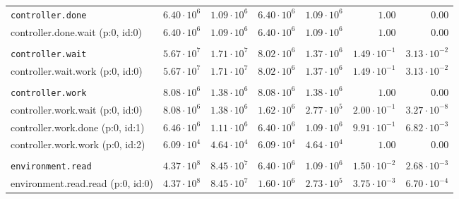 \begin{table}[htbp]
{\begin{tabular}{lrrrrrr}
\\[-8pt]\texttt{controller.done}              & $6.40 \cdot 10^{6}$ & $1.09 \cdot 10^{6}$ & $6.40 \cdot 10^{6}$ & $1.09 \cdot 10^{6}$ &               $1.00$ &               $0.00$ \\
\hspace{3mm}controller.done.wait (p:0, id:0)  & $6.40 \cdot 10^{6}$ & $1.09 \cdot 10^{6}$ & $6.40 \cdot 10^{6}$ & $1.09 \cdot 10^{6}$ &               $1.00$ &               $0.00$ \\
\\[-8pt]\texttt{controller.wait}              & $5.67 \cdot 10^{7}$ & $1.71 \cdot 10^{7}$ & $8.02 \cdot 10^{6}$ & $1.37 \cdot 10^{6}$ & $1.49 \cdot 10^{-1}$ & $3.13 \cdot 10^{-2}$ \\
\hspace{3mm}controller.wait.work (p:0, id:0)  & $5.67 \cdot 10^{7}$ & $1.71 \cdot 10^{7}$ & $8.02 \cdot 10^{6}$ & $1.37 \cdot 10^{6}$ & $1.49 \cdot 10^{-1}$ & $3.13 \cdot 10^{-2}$ \\
\\[-8pt]\texttt{controller.work}              & $8.08 \cdot 10^{6}$ & $1.38 \cdot 10^{6}$ & $8.08 \cdot 10^{6}$ & $1.38 \cdot 10^{6}$ &               $1.00$ &               $0.00$ \\
\hspace{3mm}controller.work.wait (p:0, id:0)  & $8.08 \cdot 10^{6}$ & $1.38 \cdot 10^{6}$ & $1.62 \cdot 10^{6}$ & $2.77 \cdot 10^{5}$ & $2.00 \cdot 10^{-1}$ & $3.27 \cdot 10^{-8}$ \\
\hspace{3mm}controller.work.done (p:0, id:1)  & $6.46 \cdot 10^{6}$ & $1.11 \cdot 10^{6}$ & $6.40 \cdot 10^{6}$ & $1.09 \cdot 10^{6}$ & $9.91 \cdot 10^{-1}$ & $6.82 \cdot 10^{-3}$ \\
\hspace{3mm}controller.work.work (p:0, id:2)  & $6.09 \cdot 10^{4}$ & $4.64 \cdot 10^{4}$ & $6.09 \cdot 10^{4}$ & $4.64 \cdot 10^{4}$ &               $1.00$ &               $0.00$ \\
\\[-8pt]\texttt{environment.read}             & $4.37 \cdot 10^{8}$ & $8.45 \cdot 10^{7}$ & $6.40 \cdot 10^{6}$ & $1.09 \cdot 10^{6}$ & $1.50 \cdot 10^{-2}$ & $2.68 \cdot 10^{-3}$ \\
\hspace{3mm}environment.read.read (p:0, id:0) & $4.37 \cdot 10^{8}$ & $8.45 \cdot 10^{7}$ & $1.60 \cdot 10^{6}$ & $2.73 \cdot 10^{5}$ & $3.75 \cdot 10^{-3}$ & $6.70 \cdot 10^{-4}$ \\

\end{tabular}}
\end{table}

